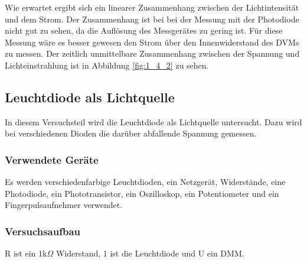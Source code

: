 \documentclass[12pt,a4paper]{article}
\begin{document}
Wie erwartet ergibt sich ein linearer Zusammenhang zwischen der Lichtintensität und dem Strom. Der Zusammenhang ist bei bei der Messung mit der Photodiode nicht gut zu sehen, da die Auflösung des Messgerätes zu gering ist. Für diese Messung wäre es besser gewesen den Strom über den Innenwiderstand des DVMs zu messen. Der zeitlich unmittelbare Zusammenhang zwischen der Spannung und Lichteinstrahlung ist in Abbildung \ref{fig:1_4_2} zu sehen.


\subsection{Leuchtdiode als Lichtquelle}

In diesem Versuchsteil wird die Leuchtdiode als Lichtquelle untersucht. Dazu wird bei verschiedenen Dioden die darüber abfallende Spannung gemessen.

\subsubsection*{Verwendete Geräte}

Es werden verschiedenfarbige Leuchtdioden, ein Netzgerät, Widerstände, eine Photodiode, ein Phototransistor, ein Oszilloskop, ein Potentiometer und ein Fingerpulsaufnehmer verwendet.

\subsubsection*{Versuchsaufbau}

R ist ein 1k$\Omega$ Widerstand, 1 ist die Leuchtdiode und U ein DMM.
\end{document}
